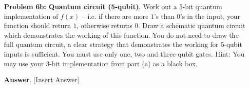 \textbf{Problem 6b: Quantum circuit (5-qubit)}. Work out a 5-bit quantum implementation of $f(x)$ – i.e. if there are more $1$'s than $0$'s in the input, your function should return $1$, otherwise returns $0$. 
Draw a schematic quantum circuit which demonstrates the working of this function. 
You do not need to draw the full quantum circuit, a clear strategy that demonstrates the working for 5-qubit inputs is sufficient. 
You must use only one, two and three-qubit gates. 
Hint: You may use your 3-bit implementation from part (a) as a black box.


\textbf{Answer}. [Insert Answer]


